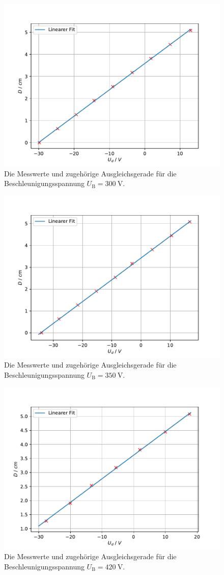 \begin{figure}[h!]
	\centering
	\includegraphics[width=0.7\linewidth]{../../Leuchtpunktverschiebung2}
	\caption{Die Messwerte und zugehörige Ausgleichsgerade für die Beschleunigungsspannung $U_\text{B} = \SI{300}{\volt}$.}
	\label{fig:leuchtpunktverschiebung2}
\end{figure}

\begin{figure}[h!]
	\centering
	\includegraphics[width=0.7\linewidth]{../../Leuchtpunktverschiebung3}
	\caption{Die Messwerte und zugehörige Ausgleichsgerade für die Beschleunigungsspannung $U_\text{B} = \SI{350}{\volt}$.}
	\label{fig:leuchtpunktverschiebung3}
\end{figure}

\begin{figure}[h!]
	\centering
	\includegraphics[width=0.7\linewidth]{../../Leuchtpunktverschiebung4}
	\caption{Die Messwerte und zugehörige Ausgleichsgerade für die Beschleunigungsspannung $U_\text{B} = \SI{420}{\volt}$.}
	\label{fig:leuchtpunktverschiebung4}
\end{figure}

